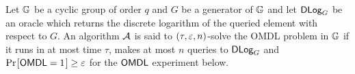 \documentclass[runningheads]{llncs}
\begin{document}
\begin{definition}
  Let $\mathbb{G}$ be a cyclic group of order $q$ and $G$ be a generator of $\mathbb{G}$ and let $\textsf{DLog}_G$ be an oracle which returns the discrete logarithm of the queried element with respect to $G$.
  An algorithm $\mathcal{A}$ is said to $(\tau, \varepsilon, n)$-solve the OMDL problem in $\mathbb{G}$ if it runs in at most time $\tau$, makes at most $n$ queries to $\textsf{DLog}_G$ and $\prob{\OMDL = 1} \geq \e$ for the $\mathsf{OMDL}$ experiment below.
  \begin{center}
  \end{center}
\end{definition}


\newcommand{\CR}{\mathsf{cr}}
\end{document}
